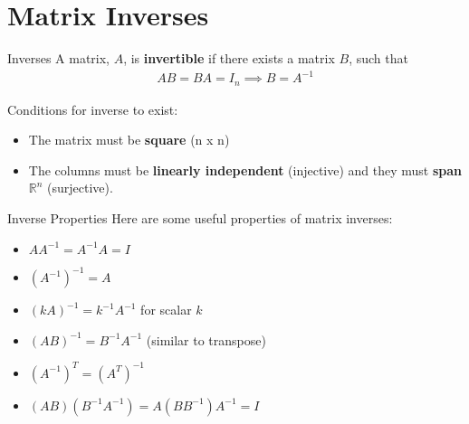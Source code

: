 \section{Matrix Inverses}

\begin{frame}{Inverses}
    A matrix, $A$, is \textbf{invertible} if there exists a matrix $B$, such that
    \begin{align*}
        AB = BA = I_n \implies B = A^{-1}
    \end{align*}
    
    Conditions for inverse to exist:
    \begin{itemize}
        \item The matrix must be \textbf{square} (n x n)
        \item The columns must be \textbf{linearly independent} (injective) and they must \textbf{span} $\mathbb{R}^n$ (surjective).
    \end{itemize}
\end{frame}

\begin{frame}{Inverse Properties}
    Here are some useful properties of matrix inverses:
    \begin{itemize}
        \item $AA^{-1} = A^{-1}A = I$
        \item $(A^{-1})^{-1} = A$
        \item $(kA)^{-1} = k^{-1}A^{-1}$ for scalar $k$
        \item $(AB)^{-1} = B^{-1}A^{-1}$ (similar to transpose)
        \item $(A^{-1})^T = (A^T)^{-1}$
        \item $(AB) (B^{-1}A^{-1}) = A (BB^{-1}) A^{-1} = I$
    \end{itemize}
\end{frame}

